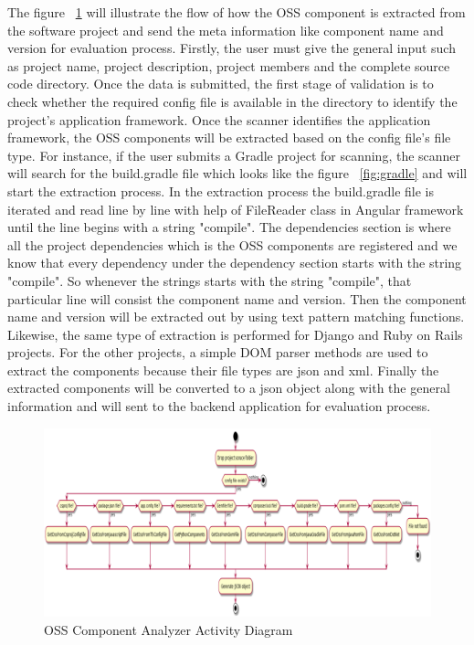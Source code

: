 The figure ~\ref{fig:Analyzer_Activity_Diagram} will illustrate the flow of how the \acs{OSS} component is extracted from the software project and send the meta information like component name and version for evaluation process. Firstly, the user must give the general input such as project name, project description, project members and the complete source code directory. Once the data is submitted, the first stage of validation is to check whether the required config file is available in the directory to identify the project's application framework. Once the scanner identifies the application framework, the \acs{OSS} components will be extracted based on the config file's file type. For instance, if the user submits a Gradle project for scanning, the scanner will search for the build.gradle file which looks like the figure ~\ref{fig:gradle} and will start the extraction process. In the extraction process the build.gradle file is iterated and read line by line with help of FileReader class in Angular framework until the line begins with a string "compile". The dependencies section is where all the project dependencies which is the \acs{OSS} components are registered and we know that every dependency under the dependency section starts with the string "compile". So whenever the strings starts with the string "compile", that particular line will consist the component name and version. Then the component name and version will be extracted out by using text pattern matching functions. Likewise, the same type of extraction is performed for Django and Ruby on Rails projects. For the other projects, a simple \acs{DOM} parser methods are used to extract the components because their file types are json and xml. Finally the extracted components will be converted to a json object along with the general information and will sent to the backend application for evaluation process.   

 \begin{figure}[H]
	\includegraphics[width=15cm]{includes/OSS_Analyzer_Activity_Diagram.png}
	\centering
	\caption{\acs{OSS} Component Analyzer Activity Diagram}
	\label{fig:Analyzer_Activity_Diagram}
\end{figure}
